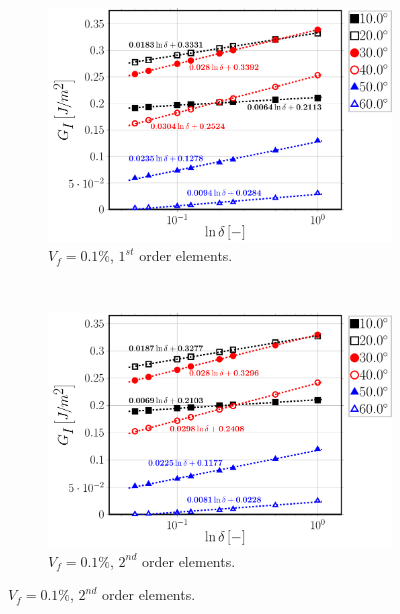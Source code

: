 \begin{figure}[!h]
\centering
    \begin{subfigure}[b]{0.48\textwidth}
        \includegraphics[width=\textwidth]{paperA/Vf0_1-free-1st-semilogvsDelta-GI.pdf}
       \caption{$V_{f}=0.1\%$, $1^{st}$ order elements.}
    \end{subfigure}
    ~
    \begin{subfigure}[b]{0.48\textwidth}
        \includegraphics[width=\textwidth]{paperA/Vf0_1-free-2nd-semilogvsDelta-GI.pdf}
       \caption{$V_{f}=0.1\%$, $2^{nd}$ order elements.}
    \end{subfigure}


\end{figure}
